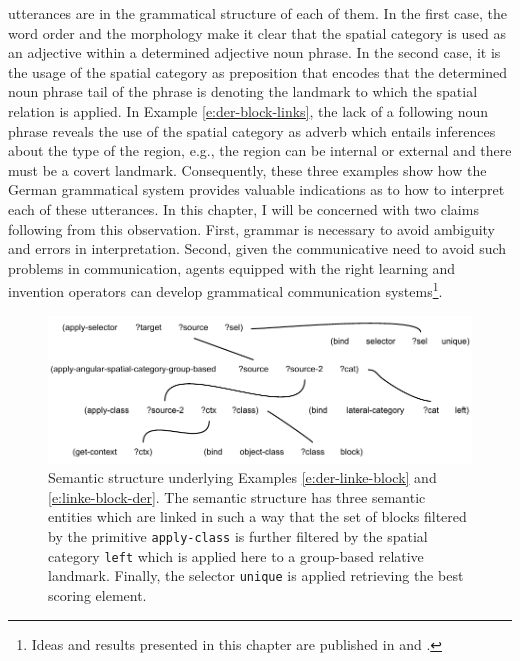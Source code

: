 utterances are in the grammatical structure of each of them. In the first case, 
the word order and the
morphology make it clear that the spatial category is used as an adjective within a
determined adjective noun phrase. In the second case, it is the usage of the spatial
category as preposition that encodes that the determined noun phrase tail of the phrase
is denoting the landmark to which the spatial relation is applied. 
In Example \ref{e:der-block-links}, the lack of a following noun phrase reveals the use of the spatial category as 
adverb which entails inferences about the type of the region, e.g., the region can be internal or external 
and there must be a covert landmark. Consequently, these three examples show how the German grammatical 
system provides valuable indications as to how to interpret each of these utterances.
In this chapter, I will be concerned with two claims following from this observation. First,
grammar is necessary to avoid ambiguity and errors in interpretation. Second, given the
communicative need to avoid such problems in communication, agents equipped with
the right learning and invention operators can develop grammatical communication systems\footnote{Ideas and results presented in this chapter are 
published in \citep{spranger2012grammar} and \citep{spranger2010space}.}.

\begin{figure}
\begin{center}
\includegraphics[width=1.0\columnwidth]{figs/semantic-structure-der-linke-block}
\end{center}
\caption[Semantic structure example spatial adjective]{Semantic structure underlying Examples \ref{e:der-linke-block} and \ref{e:linke-block-der}. 
The semantic structure has three semantic entities which are linked in such a way that
the set of blocks filtered by the primitive {\footnotesize\tt apply-class} is further
filtered by the spatial category {\footnotesize\tt left} which is applied here to a group-based 
relative landmark. Finally, the selector {\footnotesize\tt unique} is applied retrieving the 
best scoring element.}
\label{f:semantic-structure-1}
\end{figure}

